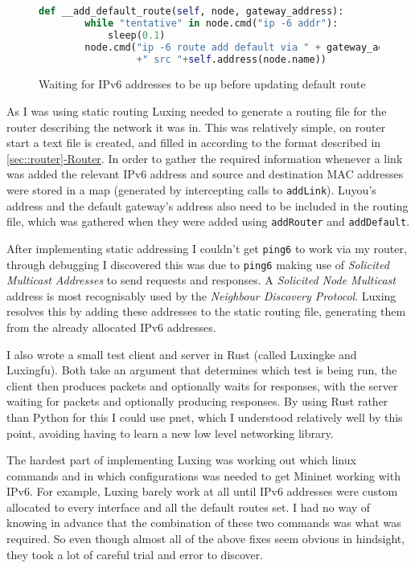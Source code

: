 \documentclass[12pt,a4paper,twoside,openany]{report}
\begin{document}
\begin{figure}
\begin{lstlisting}[language=Python]
def __add_default_route(self, node, gateway_address):
        while "tentative" in node.cmd("ip -6 addr"):
            sleep(0.1)
        node.cmd("ip -6 route add default via " + gateway_address 
                 +" src "+self.address(node.name))
\end{lstlisting}
\caption{Waiting for IPv6 addresses to be up before updating default route}
\label{fig::tentative}
\end{figure}

\bigskip

As I was using static routing Luxing needed to generate a routing file for the router describing the network it was in.  This was relatively simple, on router start a text file is created, and filled in according to the format described in \ref{sec::router}\hyperref[sec::router]{-Router}.  In order to gather the required information whenever a link was added the relevant IPv6 address and source and destination MAC addresses were stored in a map (generated by intercepting calls to \verb!addLink!).  Luyou's address and the default gateway's address also need to be included in the routing file, which was gathered when they were added using \verb!addRouter! and \verb!addDefault!.

\bigskip

After implementing static addressing I couldn't get \verb!ping6! to work via my router, through debugging I discovered this was due to \verb!ping6! making use of \textit{Solicited Multicast Addresses} to send requests and responses. A \textit{Solicited Node Multicast} address is most recognisably used by the \textit{Neighbour Discovery Protocol}\cite{ndp_rfc}. Luxing resolves this by adding these addresses to the static routing file, generating them from the already allocated IPv6 addresses.

\bigskip

I also wrote a small test client and server in Rust (called Luxingke and Luxingfu).  Both take an argument that determines which test is being run, the client then produces packets and optionally waits for responses, with the server waiting for packets and optionally producing responses.  By using Rust rather than Python for this I could use pnet, which I understood relatively well by this point, avoiding having to learn a new low level networking library.

\bigskip

The hardest part of implementing Luxing was working out which linux commands and in which configurations was needed to get Mininet working with IPv6.  For example, Luxing barely work at all until IPv6 addresses were custom allocated to every interface and all the default routes set.  I had no way of knowing in advance that the combination of these two commands was what was required.  So even though almost all of the above fixes seem obvious in hindsight, they took a lot of careful trial and error to discover.
\end{document}
